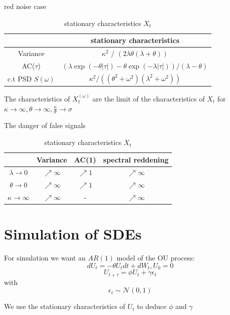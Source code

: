 \documentclass[%
thesis=student,%
coverpage=false,%
titlepage=false,%
headmarks=true, %
german,%
font=libertine, %
math=newpxtx, %
BCOR=5mm,%
coverBCOR=11mm%
]{tumbook}
\begin{document}
red noise case

\begin{table}[h!]
\centering
\begin{tabular}{|c|c|}
\hline
& stationary characteristics\\
\hline
Variance & $\kappa^2$ / $(2\lambda\theta(\lambda + \theta))$\\
AC($\tau$) & $(\lambda\exp(-\theta\lvert\tau\rvert)-\theta\exp(-\lambda\lvert\tau\rvert))/(\lambda - \theta)$\\
c.t PSD $S(\omega)$ & $\kappa^2/((\theta^2 + \omega^2)(\lambda^2 + \omega^2))$\\
\hline
\end{tabular}
\caption{stationary characteristics $X_{t}$}
\label{tab:simple_table}
\end{table}

The characteristics of $X_{t}^{(\omega)}$ are the limit of the characteristics of $X_{t}$ for $\kappa \rightarrow \infty, \theta \rightarrow \infty, \frac{\kappa}{\theta} \rightarrow \sigma$

The danger of false signals

\begin{table}[h!]
\centering
\begin{tabular}{|c|c|c|c|}
\hline
& Variance & AC(1) & spectral reddening\\
\hline
$\lambda \rightarrow 0$ & $\nearrow \infty$ & $\nearrow 1$ & $\nearrow \infty$\\
$\theta \rightarrow 0$  & $\nearrow \infty$ & $\nearrow 1$ & $\nearrow \infty$\\
$\kappa \rightarrow \infty$ & $\nearrow \infty$ & - & $\nearrow \infty$\\    
\hline
\end{tabular}
\caption{stationary characteristics $X_{t}$}
\label{tab:simple_table}
\end{table}


        

\chapter{Simulation of SDEs}

For simulation we want an $AR(1)$ model of the OU process:
    \[
    dU_{t} = -\theta U_{t}dt + dW_{t}, U_{0} = 0 
    \]
    \[
     U_{t+\tau} = \phi U_{t} + \gamma \epsilon_{t} 
    \]
    with 
    \[
    \epsilon_{t} \sim \mathcal{N}(0,1)
    \]

We use the stationary characteristics of $U_{t}$ to deduce $\phi$ and $\gamma$
\end{document}
